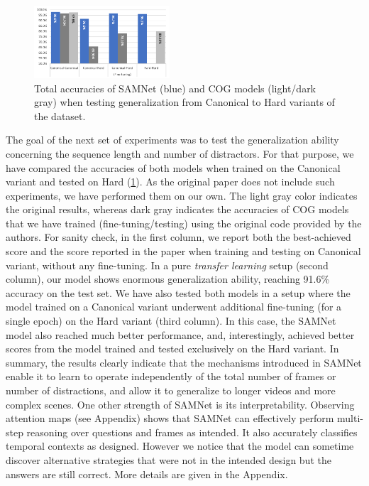 \begin{figure}
	\centering
	\includegraphics[width=0.45\textwidth]{../results/samnet_cog_overall_transfer.png}
	\caption{Total accuracies of SAMNet (blue) and COG models (light/dark gray) when testing generalization from Canonical to Hard variants of the dataset.}
	\label{fig:samnet_cog_overall_transfer}
\end{figure}

The goal of the next set of experiments was to test the generalization ability concerning the sequence length and number of distractors.
For that purpose, we have compared the accuracies of both models when trained on the Canonical variant and tested on Hard (\cref{fig:samnet_cog_overall_transfer}).
As the original paper does not include such experiments, we have performed them on our own.  The light gray color indicates the original results, whereas dark gray indicates the accuracies of COG models that we have trained (fine-tuning/testing) using the original code provided by the authors.
For sanity check, in the first column, we report both the best-achieved score and the score reported in the paper when training and testing on Canonical variant, without any fine-tuning.
In a pure \textit{transfer learning} setup (second column), our model shows enormous generalization ability, reaching 91.6\% accuracy on the test set.
We have also tested both models in a setup where the model trained on a Canonical variant underwent additional fine-tuning (for a single epoch) on the Hard variant (third column).
In this case, the SAMNet model also reached much better performance, and, interestingly, achieved better scores from the model trained and tested exclusively on the Hard variant.
In summary, the results clearly indicate that the mechanisms introduced in SAMNet  enable it to learn to operate independently of the total number of frames or number of distractions, and allow it to generalize to longer videos and more complex scenes. One other strength of SAMNet is its interpretability. Observing attention maps (see Appendix) shows that SAMNet can effectively perform multi-step reasoning over questions and frames as intended. It also accurately classifies temporal contexts as designed. However we notice that the model can sometime discover alternative strategies that were not in the intended design but the answers are still correct. More details are given in the Appendix.


